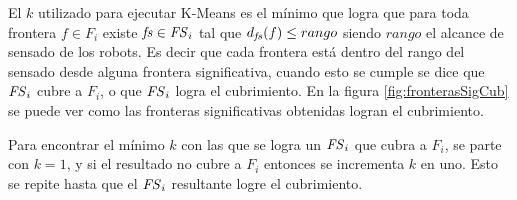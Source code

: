 El $k$ utilizado para ejecutar K-Means es el mínimo que logra que para toda
frontera $f\in F_i$ existe $\mathit{fs} \in \mathit{FS}_i$ tal que $d_{\mathit{fs}}(f) \leq
rango$ siendo $rango$ el alcance de sensado de los robots. Es decir que %
cada frontera está dentro del rango del sensado desde alguna frontera
significativa, cuando esto se cumple se dice que $\mathit{FS}_i$ cubre a $F_i$, o
que $\mathit{FS}_i$ logra el cubrimiento. En la figura \ref{fig:fronterasSigCub} se
puede ver como las fronteras significativas obtenidas logran el cubrimiento.


Para encontrar el mínimo $k$ con las que se logra un $\mathit{FS}_i$ que cubra a
$F_i$, se parte con $k=1$, y si el resultado no cubre a $F_i$ entonces se
incrementa $k$ en uno. Esto se repite hasta que el $\mathit{FS}_i$ resultante
logre el cubrimiento.


